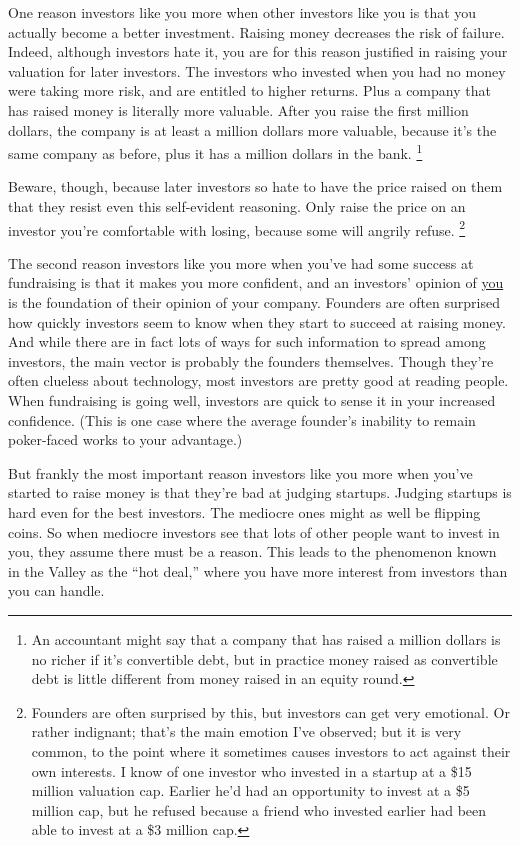 \documentclass[12pt]{book}
\begin{document}
One reason investors like you more when other investors like you is that
you actually become a better investment. Raising money decreases the
risk of failure. Indeed, although investors hate it, you are for this
reason justified in raising your valuation for later investors. The
investors who invested when you had no money were taking more risk, and
are entitled to higher returns. Plus a company that has raised money is
literally more valuable. After you raise the first million dollars, the
company is at least a million dollars more valuable, because it's the
same company as before, plus it has a million dollars in the bank.
\footnote{An accountant might say that a company that has raised a million
dollars is no richer if it's convertible debt, but in practice money
raised as convertible debt is little different from money raised in an
equity round.}

Beware, though, because later investors so hate to have the price raised
on them that they resist even this self-evident reasoning. Only raise
the price on an investor you're comfortable with losing, because some
will angrily refuse. \footnote{Founders are often surprised by this, but investors can get very
emotional. Or rather indignant; that's the main emotion I've observed;
but it is very common, to the point where it sometimes causes investors
to act against their own interests. I know of one investor who invested
in a startup at a \$15 million valuation cap. Earlier he'd had an
opportunity to invest at a \$5 million cap, but he refused because a
friend who invested earlier had been able to invest at a \$3 million
cap.}

The second reason investors like you more when you've had some success
at fundraising is that it makes you more confident, and an investors'
opinion of \href{convince.html}{you} is the foundation of their opinion
of your company. Founders are often surprised how quickly investors seem
to know when they start to succeed at raising money. And while there are
in fact lots of ways for such information to spread among investors, the
main vector is probably the founders themselves. Though they're often
clueless about technology, most investors are pretty good at reading
people. When fundraising is going well, investors are quick to sense it
in your increased confidence. (This is one case where the average
founder's inability to remain poker-faced works to your advantage.)

But frankly the most important reason investors like you more when
you've started to raise money is that they're bad at judging startups.
Judging startups is hard even for the best investors. The mediocre ones
might as well be flipping coins. So when mediocre investors see that
lots of other people want to invest in you, they assume there must be a
reason. This leads to the phenomenon known in the Valley as the ``hot
deal,'' where you have more interest from investors than you can handle.
\end{document}
